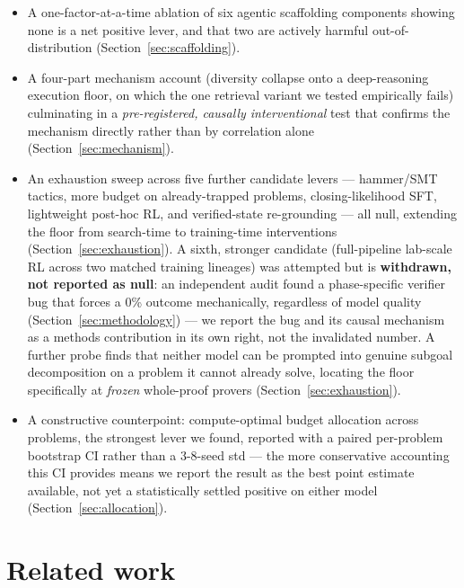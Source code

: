 \documentclass{article}
\begin{document}
\begin{itemize}
  \item A one-factor-at-a-time ablation of six agentic scaffolding components showing none is a net
    positive lever, and that two are actively harmful out-of-distribution (Section~\ref{sec:scaffolding}).
  \item A four-part mechanism account (diversity collapse onto a deep-reasoning execution floor, on
    which the one retrieval variant we tested empirically fails) culminating in a \emph{pre-registered,
    causally interventional} test that confirms the mechanism directly rather than by correlation alone
    (Section~\ref{sec:mechanism}).
  \item An exhaustion sweep across five further candidate levers --- hammer/SMT tactics, more budget on
    already-trapped problems, closing-likelihood SFT, lightweight post-hoc RL, and verified-state
    re-grounding --- all null, extending the floor from search-time to training-time interventions
    (Section~\ref{sec:exhaustion}). A sixth, stronger candidate (full-pipeline lab-scale RL across two
    matched training lineages) was attempted but is \textbf{withdrawn, not reported as null}: an
    independent audit found a phase-specific verifier bug that forces a 0\% outcome mechanically,
    regardless of model quality (Section~\ref{sec:methodology}) --- we report the bug and its causal
    mechanism as a methods contribution in its own right, not the invalidated number. A further probe
    finds that neither model can be prompted into genuine subgoal decomposition on a problem it cannot
    already solve, locating the floor specifically at \emph{frozen} whole-proof provers
    (Section~\ref{sec:exhaustion}).
  \item A constructive counterpoint: compute-optimal budget allocation across problems, the strongest
    lever we found, reported with a paired per-problem bootstrap CI rather than a 3-8-seed std --- the
    more conservative accounting this CI provides means we report the result as the best point estimate
    available, not yet a statistically settled positive on either model (Section~\ref{sec:allocation}).
\end{itemize}

\section{Related work}
\label{sec:related}
\end{document}
